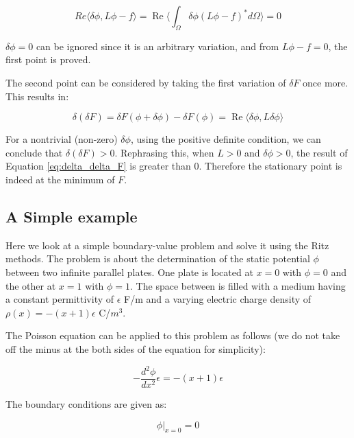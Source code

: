 \documentclass[a4paper,12pt]{report}
\renewcommand{\Re}{\operatorname{Re}}
\begin{document}
\begin{equation}
  Re\langle \delta\phi, L\phi-f\rangle = \Re \langle \int_{\Omega} \delta\phi (L\phi - f)^{*} d\Omega \rangle = 0
\end{equation}

$\delta\phi = 0$ can be ignored since it is an arbitrary variation,
and from $L\phi - f = 0$, the first point is proved.

The second point can be considered by taking the first variation of $\delta F$
once more.
This results in:

\begin{equation} \label{eq:delta_delta_F}
  \delta(\delta F) = \delta F(\phi + \delta \phi) - \delta F(\phi) = \Re\langle \delta\phi, L\delta\phi \rangle
\end{equation}

For a nontrivial (non-zero) $\delta\phi$,
using the positive definite condition,
we can conclude that $\delta(\delta F) > 0$.
Rephrasing this, when $L > 0$ and $\delta \phi > 0$, 
the result of Equation \ref{eq:delta_delta_F} is greater than 0.
Therefore the stationary point is indeed at the minimum of $F$.

\subsection{A Simple example}

Here we look at a simple boundary-value problem and solve it using
the Ritz methods.
The problem is about the determination of the static potential $\phi$
between two infinite parallel plates.
One plate is located at $x=0$ with $\phi=0$ and
the other at $x=1$ with $\phi=1$.
The space between is filled with a medium having a constant permittivity
of $\epsilon$ F/m and a varying electric charge density of
$\rho(x)=-(x+1)\epsilon$ C/$m^3$.

The Poisson equation can be applied to this problem as follows
(we do not take off the minus at the both sides of the equation
for simplicity):

\begin{equation} \label{eq:simple_boundary_value_problem}
  -\frac{d^2\phi}{dx^2}\epsilon = -(x + 1)\epsilon
\end{equation}

The boundary conditions are given as:

\begin{equation}
  \left.\phi\right|_{x=0} = 0
\end{equation}
\end{document}
